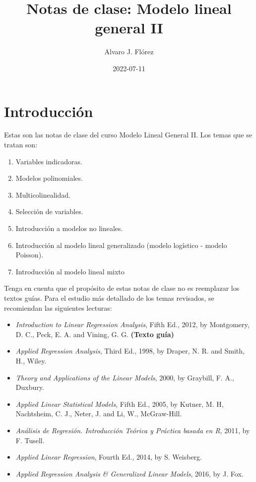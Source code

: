 \documentclass[
]{article}
\title{Notas de clase: Modelo lineal general II}
\author{Alvaro J. Flórez}
\date{2022-07-11}
\providecommand{\tightlist}{%
  \setlength{\itemsep}{0pt}\setlength{\parskip}{0pt}}
\begin{document}
\maketitle

{
\setcounter{tocdepth}{2}
\tableofcontents
}
\hypertarget{introducciuxf3n}{%
\section*{Introducción}\label{introducciuxf3n}}

Estas son las notas de clase del curso Modelo Lineal General II. Los temas que se tratan son:

\begin{enumerate}
\def\labelenumi{\arabic{enumi}.}
\tightlist
\item
  Variables indicadoras.
\item
  Modelos polinomiales.
\item
  Multicolinealidad.
\item
  Selección de variables.
\item
  Introducción a modelos no lineales.
\item
  Introducción al modelo lineal generalizado (modelo logístico - modelo Poisson).
\item
  Introducción al modelo lineal mixto
\end{enumerate}

Tenga en cuenta que el propósito de estas notas de clase no es reemplazar los textos guías. Para el estudio más detallado de los temas revisados, se recomiendan las siguientes lecturas:

\begin{itemize}
\tightlist
\item
  \emph{Introduction to Linear Regression Analysis}, Fifth Ed., 2012, by Montgomery, D. C., Peck, E. A. and Vining, G. G. \textbf{(Texto guía)}
\item
  \emph{Applied Regression Analysis}, Third Ed., 1998, by Draper, N. R. and Smith, H., Wiley.
\item
  \emph{Theory and Applications of the Linear Models}, 2000, by Graybill, F. A., Duxbury.
\item
  \emph{Applied Linear Statistical Models}, Fifth Ed., 2005, by Kutner, M. H, Nachtsheim, C. J., Neter, J. and Li, W., McGraw-Hill.
\item
  \emph{Análisis de Regresión. Introducción Teórica y Práctica basada en R}, 2011, by F. Tusell.
\item
  \emph{Applied Linear Regression}, Fourth Ed., 2014, by S. Weisberg.
\item
  \emph{Applied Regression Analysis \& Generalized Linear Models}, 2016, by J. Fox.
\end{itemize}
\end{document}
